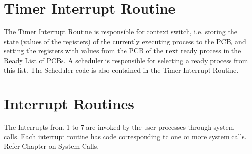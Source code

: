 \documentclass[10pt]{report}
\begin{document}
\section{Timer Interrupt Routine}
\label{sec:timer}

The Timer Interrupt Routine is responsible for context switch, i.e. storing the state (values of the registers) of the currently executing process to the PCB, and setting the registers with values from the PCB of the next ready process in the Ready List of PCBs. A scheduler is responsible for selecting a ready process from this list. The Scheduler code is also contained in the Timer Interrupt Routine.

\section{Interrupt Routines}
\label{sec:interrupt}
The Interrupts from 1 to 7  are invoked by the user processes through system calls. Each interrupt routine has code corresponding to one or more system calls. Refer Chapter on System Calls. 
\end{document}
